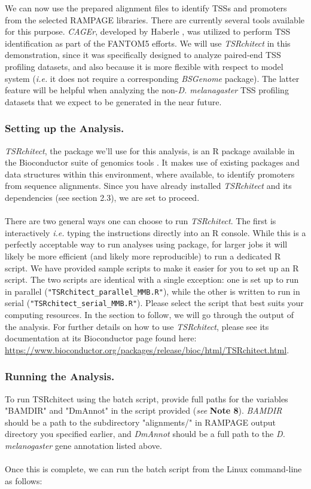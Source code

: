 \documentclass[runningheads,a4paper]{llncs}
\begin{document}
\begin{linenumbers}
We can now use the prepared alignment files to identify TSSs and promoters from the selected RAMPAGE libraries.
There are currently several tools available for this purpose.
\textit{CAGEr}, developed by Haberle \cite{Haberle:2015fp}, was utilized to perform TSS identification as part of the FANTOM5 efforts.
We will use \textit{TSRchitect} in this demonstration, since it was specifically designed to analyze paired-end TSS profiling datasets, and also because it is more flexible with respect to model system (\textit{i.e.} it does not require a corresponding \textit{BSGenome} \cite{Pagès:2016fc} package).
The latter feature will be helpful when analyzing the non-\textit{D. melanagaster} TSS profiling datasets that we expect to be generated in the near future.

\subsubsection{Setting up the Analysis.}
\textit{TSRchitect}, the package we'll use for this analysis, is an R package available in the Bioconductor suite of genomics tools \cite{Lawrence:2014gy}.
It makes use of existing packages and data structures within this environment, where available, to identify promoters from sequence alignments.
Since you have already installed \textit{TSRchitect} and its dependencies (see section 2.3), we are set to proceed.\\
\\
There are two general ways one can choose to run \textit{TSRchitect}. 
The first is interactively \textit{i.e.} typing the instructions directly into an R console.
While this is a perfectly acceptable way to run analyses using package, for larger jobs it will likely be more efficient (and likely more reproducible) to run a dedicated R script.
We have provided sample scripts to make it easier for you to set up an R script.
The two scripts are identical with a single exception: one is set up to run in parallel (\texttt{"TSRchitect\_parallel\_MMB.R"}), while the other is written to run in serial (\texttt{"TSRchitect\_serial\_MMB.R"}). 
Please select the script that best suits your computing resources.
In the section to follow, we will go through the output of the analysis. 
For further details on how to use \textit{TSRchitect}, please see its documentation at its Bioconductor page found here: \url{https://www.bioconductor.org/packages/release/bioc/html/TSRchitect.html}.

\subsubsection{Running the Analysis.}
To run TSRchitect using the batch script, provide full paths for the variables "BAMDIR" and "DmAnnot" in the script provided (\textit{see} \textbf{Note 8}).
\textit{BAMDIR} should be a path to the subdirectory "alignments/" in RAMPAGE output directory you specified earlier, and \textit{DmAnnot} should be a full path to the \textit{D. melanogaster} gene annotation listed above.\\
\\
Once this is complete, we can run the batch script from the Linux command-line as follows:


\end{linenumbers}
\end{document}

